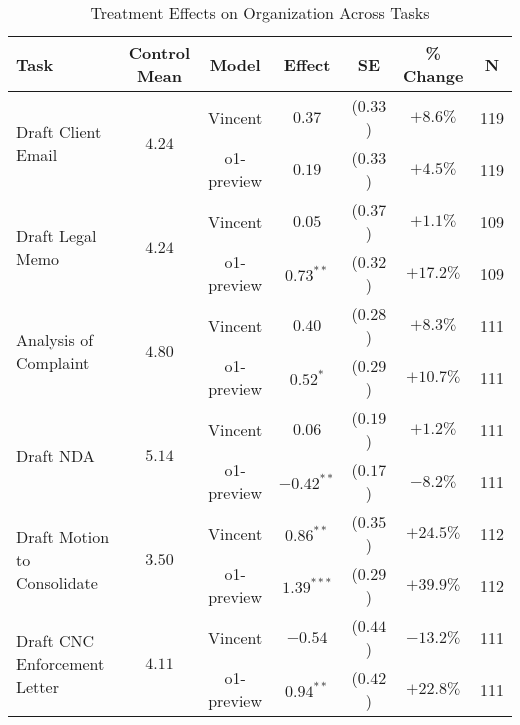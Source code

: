 \begin{table}[!htbp]
\centering
\caption{Treatment Effects on Organization Across Tasks}
\label{tab:organization_effects_controls}
\vspace{0.3cm}
\begin{tabular}{lcccccc}
\hline\hline
Task & Control Mean & Model & Effect & SE & \% Change & N \\
\hline
\multirow{2}{*}{Draft Client Email} & \multirow{2}{*}{$4.24$} & Vincent & $0.37$ & ($0.33$) & $+8.6\%$ & 119 \\
& & o1-preview & $0.19$ & ($0.33$) & $+4.5\%$ & 119 \\
\hline
\multirow{2}{*}{Draft Legal Memo} & \multirow{2}{*}{$4.24$} & Vincent & $0.05$ & ($0.37$) & $+1.1\%$ & 109 \\
& & o1-preview & $0.73^{**}$ & ($0.32$) & $+17.2\%$ & 109 \\
\hline
\multirow{2}{*}{Analysis of Complaint} & \multirow{2}{*}{$4.80$} & Vincent & $0.40$ & ($0.28$) & $+8.3\%$ & 111 \\
& & o1-preview & $0.52^{*}$ & ($0.29$) & $+10.7\%$ & 111 \\
\hline
\multirow{2}{*}{Draft NDA} & \multirow{2}{*}{$5.14$} & Vincent & $0.06$ & ($0.19$) & $+1.2\%$ & 111 \\
& & o1-preview & $-0.42^{**}$ & ($0.17$) & $-8.2\%$ & 111 \\
\hline
\multirow{2}{*}{Draft Motion to Consolidate} & \multirow{2}{*}{$3.50$} & Vincent & $0.86^{**}$ & ($0.35$) & $+24.5\%$ & 112 \\
& & o1-preview & $1.39^{***}$ & ($0.29$) & $+39.9\%$ & 112 \\
\hline
\multirow{2}{*}{Draft CNC Enforcement Letter} & \multirow{2}{*}{$4.11$} & Vincent & $-0.54$ & ($0.44$) & $-13.2\%$ & 111 \\
& & o1-preview & $0.94^{**}$ & ($0.42$) & $+22.8\%$ & 111 \\
\hline
\hline\hline
\end{tabular}

\vspace{0.5cm}


\end{table}
